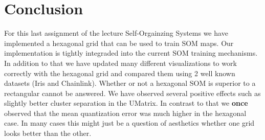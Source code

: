 \documentclass{acm_proc_article-sp}
\begin{document}
\section{Conclusion}

For this last assignment of the lecture Self-Orgainzing Systems we have implemented a hexagonal grid that can be used to train SOM maps. Our implementation is tightly integraded into the current SOM training mechanisms.
In addition to that we have updated many different visualizations to work correctly with the hexagonal grid and compared them using 2 well known datasets (Iris and Chainlink).
Whether or not a hexagonal SOM is superior to a rectangular cannot be answered. We have observed several positive effects such as slightly better cluster separation in the UMatrix. In contrast to that we \textbf{once} observed that the mean quantization error was much higher in the hexagonal case.
In many cases this might just be a question of aesthetics whether one grid looks better than the other.



\end{document}

